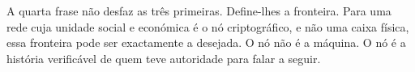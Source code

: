 A quarta frase não desfaz as três primeiras. Define-lhes a fronteira. Para uma
rede cuja unidade social e económica é o nó criptográfico, e não uma caixa
física, essa fronteira pode ser exactamente a desejada. O nó não é a máquina.
O nó é a história verificável de quem teve autoridade para falar a seguir.
